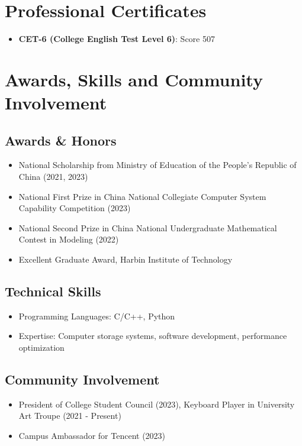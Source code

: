 \documentclass{resume}
\begin{document}
\section{Professional Certificates}
\begin{itemize}
  \item \textbf{CET-6 (College English Test Level 6)}: Score 507
\end{itemize}

\section{Awards, Skills and Community Involvement}
\subsection*{Awards \& Honors}
\begin{itemize}[parsep=0.1ex]
  \item National Scholarship from Ministry of Education of the People's Republic of China (2021, 2023)
  \item National First Prize in China National Collegiate Computer System Capability Competition (2023)
  \item National Second Prize in China National Undergraduate Mathematical Contest in Modeling (2022)
  \item Excellent Graduate Award, Harbin Institute of Technology
\end{itemize}

\subsection*{Technical Skills}
\begin{itemize}[parsep=0.1ex]
  \item Programming Languages: C/C++, Python
  \item Expertise: Computer storage systems, software development, performance optimization
\end{itemize}

\subsection*{Community Involvement}
\begin{itemize}[parsep=0.1ex]
  \item President of College Student Council (2023), Keyboard Player in University Art Troupe (2021 - Present)
  \item Campus Ambassador for Tencent (2023)
\end{itemize}
\end{document}
